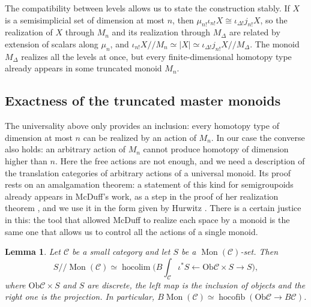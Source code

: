 \documentclass[11pt]{amsart}
\newtheorem{lemma}[teo]{Lemma}
\theoremstyle{definition}
\theoremstyle{remark}
\numberwithin{figure}{section}%
\DeclareMathOperator{\Mon}{Mon}
\DeclareMathOperator{\hocolim}{hocolim}
\DeclareMathOperator{\hocofib}{hocofib}
\newcommand{\C}{\mathcal{C}}
\newcommand{\Ob}{\mathrm{Ob}}
\begin{document}
The compatibility between levels allows us to state the construction stably. If $X$ is a semisimplicial set of dimension at most $n$, then $\mu_{n!}\iota_{n!}X\cong\iota_{\Delta!}j_{n!}X$, so the realization of $X$ through $M_n$ and its realization through $M_\Delta$ are related by extension of scalars along $\mu_n$, and $\iota_{n!}X/\!/M_n\simeq|X|\simeq\iota_{\Delta!}j_{n!}X/\!/M_\Delta$. The monoid $M_\Delta$ realizes all the levels at once, but every finite-dimensional homotopy type already appears in some truncated monoid $M_n$.

\subsection{Exactness of the truncated master monoids}
\label{subsec:exactness-truncated-monoids}

The universality above only provides an inclusion: every homotopy type of dimension at most $n$ can be realized by an action of $M_n$. In our case the converse also holds: an arbitrary action of $M_n$ cannot produce homotopy of dimension higher than $n$. Here the free actions are not enough, and we need a description of the translation categories of arbitrary actions of a universal monoid. Its proof rests on an amalgamation theorem: a statement of this kind for semigroupoids already appears in McDuff's work, as a step in the proof of her realization theorem \cite[Lemma~4]{McDuff}, and we use it in the form given by Hurwitz \cite[Thm.~2]{Hurwitz}. There is a certain justice in this: the tool that allowed McDuff to realize each space by a monoid is the same one that allows us to control all the actions of a single monoid.

\begin{lemma}\label{lem:arbitrary-actions}
Let $\C$ be a small category and let $S$ be a $\Mon(\C)$-set. Then
\[
S/\!/\Mon(\C)\simeq\hocolim\big(B\!\textstyle\int_\C\iota^*S\longleftarrow\Ob\C\times S\longrightarrow S\big),
\]
where $\Ob\C\times S$ and $S$ are discrete, the left map is the inclusion of objects and the right one is the projection. In particular, $B\Mon(\C)\simeq\hocofib(\Ob\C\to B\C)$.
\end{lemma}
\end{document}
